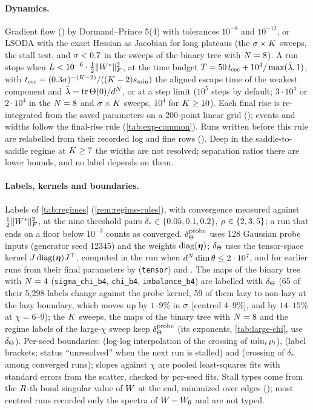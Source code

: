 \paragraph{Dynamics.}
Gradient flow () by Dormand--Prince 5(4) with tolerances $10^{-8}$ and
$10^{-12}$, or LSODA with the exact Hessian as Jacobian for long plateaus (the $\sigma\times K$ sweeps, the stall test,
and $\sigma<0.7$ in the sweeps of the binary tree with $N=8$). A run stops when $L<10^{-6}\cdot\frac12\lVert W^{*}\rVert_{F}^2$, at the time budget
$T=50\,t_{\rm esc}+10^4/\max(\bar\lambda,1)$, with $t_{\rm esc}=(0.3\sigma)^{-(K-2)}/((K-2)s_{\min})$ the
aligned escape time of the weakest component and $\bar\lambda=\operatorname{tr}\Theta(0)/d^N$, or at a step limit ($10^5$
steps by default; $3\cdot10^4$ or $2\cdot10^4$ in the $N=8$ and $\sigma\times K$ sweeps, $10^4$ for $K\ge10$).
Each final rise is re-integrated from the saved parameters on a 200-point linear grid
(); events and widths follow the final-rise rule (\cref{tab:exp-common}). Runs written
before this rule are relabelled from their recorded log and fine rows (). Deep in the
saddle-to-saddle regime at $K\ge7$ the widths are not resolved; separation ratios there are lower bounds, and
no label depends on them.

\paragraph{Labels, kernels and boundaries.}
Labels of \cref{tab:regimes} (\cref{rem:regime-rules}), with convergence measured against $\frac12\lVert W^{*}\rVert_{F}^2$,
at the nine threshold pairs $\delta_*\in\{0.05,0.1,0.2\}$, $\rho_{}\in\{2,3,5\}$; a run that ends on a floor below
$10^{-3}$ counts as converged. $\delta_{\Theta}^{\rm probe}$ uses 128 Gaussian probe inputs (generator seed 12345) and the
weights $\operatorname{diag}(\boldsymbol{\eta})$; $\delta_{\Theta}$ uses the tensor-space kernel $J\operatorname{diag}(\boldsymbol{\eta})J^{\top}$, computed in the run when
$d^N\dim\theta\le2\cdot10^7$, and for earlier runs from their final parameters by 
(\texttt{tensor}) and . The maps of the binary tree with $N=4$ (\texttt{sigma\_chi\_b4},
\texttt{chi\_b4}, \texttt{imbalance\_b4}) are labelled with $\delta_{\Theta}$ (65 of their 5,298 labels change against the probe
kernel, 59 of them lazy to non-lazy at the lazy boundary, which moves up by $1$--$9\%$ in $\sigma$ [centred $4$--$9\%$],
and by $14$--$15\%$ at $\chi=6$--$9$); the
$K$ sweeps, the maps of the binary tree with $N=8$ and the regime labels of the large-$\chi$ sweep keep
$\delta_{\Theta}^{\rm probe}$ (its exponents, \cref{tab:large-chi}, use $\delta_{\Theta}$).
Per-seed boundaries:  (log-log interpolation of the crossing of $\min_i\rho_{i}$),
 (label brackets; status ``unresolved'' when the next run is stalled) and
 (crossing of $\delta_*$ among converged runs); slopes against $\chi$ are pooled
least-squares fits with standard errors from the scatter, checked by per-seed fits. Stall types come from the
$R$-th bond singular value of $W$ at the end, minimized over edges (); most centred
runs recorded only the spectra of $W-W_{0}$ and are not typed.

